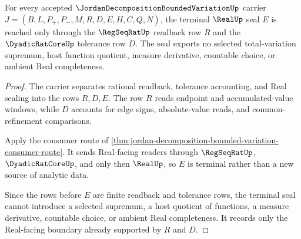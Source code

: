 \begin{theorem}
\label{thm:jordan-decomposition-real-seal-nonescape}
For every accepted $\JordanDecompositionBoundedVariationUp$ carrier $J=(B,L,P_{+},P_{-},M,R,D,E,H,C,Q,N)$, the terminal $\RealUp$ seal $E$ is reached only through the $\RegSeqRatUp$ readback row $R$ and the $\DyadicRatCoreUp$ tolerance row $D$. The seal exports no selected total-variation supremum, host function quotient, measure derivative, countable choice, or ambient Real completeness.
\end{theorem}
\begin{proof}
The carrier separates rational readback, tolerance accounting, and Real sealing into the rows $R,D,E$. The row $R$ reads endpoint and accumulated-value windows, while $D$ accounts for edge signs, absolute-value reads, and common-refinement comparisons.

Apply the consumer route of \autoref{thm:jordan-decomposition-bounded-variation-consumer-route}. It sends Real-facing readers through $\RegSeqRatUp$, $\DyadicRatCoreUp$, and only then $\RealUp$, so $E$ is terminal rather than a new source of analytic data.

Since the rows before $E$ are finite readback and tolerance rows, the terminal seal cannot introduce a selected supremum, a host quotient of functions, a measure derivative, countable choice, or ambient Real completeness. It records only the Real-facing boundary already supported by $R$ and $D$.
\end{proof}




